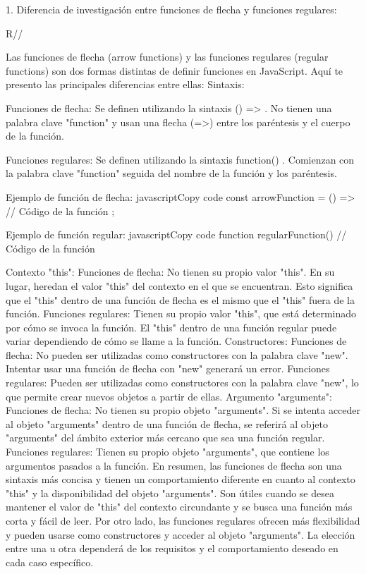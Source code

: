 1. Diferencia de investigación entre funciones de flecha y funciones regulares: 

R// 

Las funciones de flecha (arrow functions) y las funciones regulares (regular functions) son dos formas distintas de definir funciones en JavaScript. Aquí te presento las principales diferencias entre ellas:
Sintaxis:

Funciones de flecha: Se definen utilizando la sintaxis () => {}. No tienen una palabra clave "function" y usan una flecha (=>) entre los paréntesis y el cuerpo de la función.

Funciones regulares: Se definen utilizando la sintaxis function() {}. Comienzan con la palabra clave "function" seguida del nombre de la función y los paréntesis.

Ejemplo de función de flecha:
javascriptCopy code
const arrowFunction = () => {
  // Código de la función
};

Ejemplo de función regular:
javascriptCopy code
function regularFunction() {
  // Código de la función
}

Contexto "this":
Funciones de flecha: No tienen su propio valor "this". En su lugar, heredan el valor "this" del contexto en el que se encuentran. Esto significa que el "this" dentro de una función de flecha es el mismo que el "this" fuera de la función.
Funciones regulares: Tienen su propio valor "this", que está determinado por cómo se invoca la función. El "this" dentro de una función regular puede variar dependiendo de cómo se llame a la función.
Constructores:
Funciones de flecha: No pueden ser utilizadas como constructores con la palabra clave "new". Intentar usar una función de flecha con "new" generará un error.
Funciones regulares: Pueden ser utilizadas como constructores con la palabra clave "new", lo que permite crear nuevos objetos a partir de ellas.
Argumento "arguments":
Funciones de flecha: No tienen su propio objeto "arguments". Si se intenta acceder al objeto "arguments" dentro de una función de flecha, se referirá al objeto "arguments" del ámbito exterior más cercano que sea una función regular.
Funciones regulares: Tienen su propio objeto "arguments", que contiene los argumentos pasados a la función.
En resumen, las funciones de flecha son una sintaxis más concisa y tienen un comportamiento diferente en cuanto al contexto "this" y la disponibilidad del objeto "arguments". 
Son útiles cuando se desea mantener el valor de "this" del contexto circundante y se busca una función más corta y fácil de leer. Por otro lado, las funciones regulares ofrecen más flexibilidad y pueden usarse como constructores y acceder al objeto "arguments". 
La elección entre una u otra dependerá de los requisitos y el comportamiento deseado en cada caso específico.

